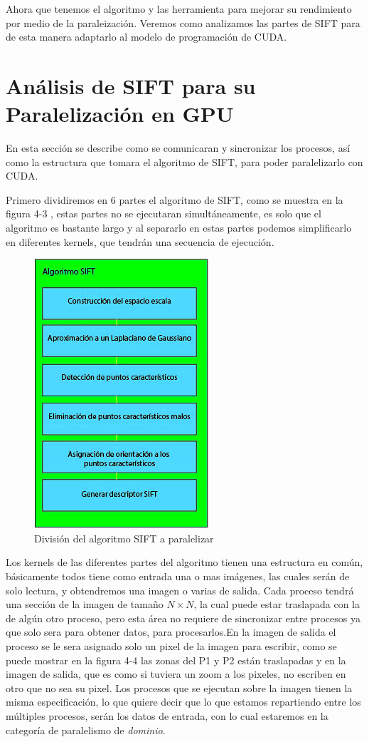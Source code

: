 Ahora que tenemos el algoritmo y las herramienta para mejorar su rendimiento por medio de la paraleización. Veremos como analizamos las partes de SIFT para de esta manera adaptarlo al modelo de programación de CUDA.
\pagebreak
\section{Análisis de SIFT para su Paralelización en GPU}

En esta sección se describe como se comunicaran y sincronizar los procesos, así como la estructura que tomara el algoritmo de SIFT, para poder paralelizarlo con CUDA. 

Primero dividiremos en 6 partes el algoritmo de SIFT, como se muestra en la figura 4-3 , estas partes no se ejecutaran simultáneamente, es solo que el algoritmo es bastante largo y al separarlo en estas partes podemos simplificarlo en diferentes kernels, que tendrán una secuencia de ejecución. 

\begin{figure}[h]
			\centering
				\includegraphics[scale=1]{img/SIFTdiv.jpg}
			\caption{División del algoritmo SIFT a paralelizar}
\end{figure}



Los kernels de las diferentes partes del algoritmo tienen una estructura en común, básicamente todos tiene como entrada una o mas imágenes, las cuales serán de solo lectura, y obtendremos una imagen o varias de salida. Cada proceso tendrá una sección de la imagen de tamaño  $N \times N$, la cual puede estar traslapada con la de algún otro proceso, pero esta área no requiere de sincronizar entre procesos ya que solo sera para obtener datos, para procesarlos.En la imagen de salida el proceso se le sera asignado solo un pixel de la imagen para escribir, como se puede mostrar en la figura 4-4 las zonas del P1 y P2 están traslapadas y en la imagen de salida, que es como si tuviera un zoom a los pixeles, no escriben en otro que no sea su pixel. Los procesos que se ejecutan sobre la imagen tienen la misma especificación, lo que quiere decir que lo que estamos repartiendo entre los múltiples procesos, serán los datos de entrada, con lo cual estaremos en la categoría de paralelismo de \textit{dominio}.



